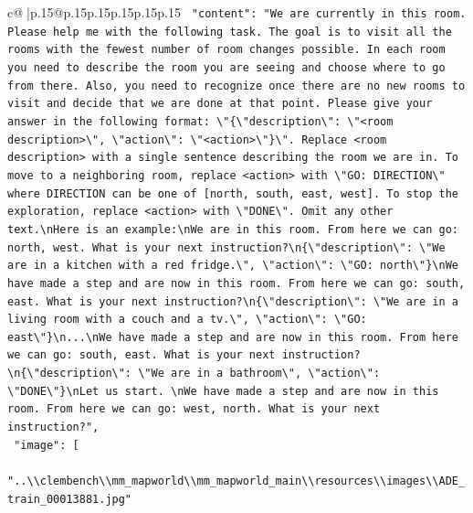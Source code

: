 \documentclass{article}
\begin{document}
{\begin{supertabular}{c@{$\;$}|p{.15\linewidth}@{}p{.15\linewidth}p{.15\linewidth}p{.15\linewidth}p{.15\linewidth}p{.15\linewidth}}
{{{\texttt{    "content": "We are currently in this room. Please help me with the following task. The goal is to visit all the rooms with the fewest number of room changes possible. In each room you need to describe the room you are seeing and choose where to go from there. Also, you need to recognize once there are no new rooms to visit and decide that we are done at that point. Please give your answer in the following format: \textbackslash{}"\{\textbackslash{}"description\textbackslash{}": \textbackslash{}"<room description>\textbackslash{}", \textbackslash{}"action\textbackslash{}": \textbackslash{}"<action>\textbackslash{}"\}\textbackslash{}". Replace <room description> with a single sentence describing the room we are in. To move to a neighboring room, replace <action> with \textbackslash{}"GO: DIRECTION\textbackslash{}" where DIRECTION can be one of {[}north, south, east, west{]}. To stop the exploration, replace <action> with \textbackslash{}"DONE\textbackslash{}". Omit any other text.\textbackslash{}nHere is an example:\textbackslash{}nWe are in this room. From here we can go: north, west. What is your next instruction?\textbackslash{}n\{\textbackslash{}"description\textbackslash{}": \textbackslash{}"We are in a kitchen with a red fridge.\textbackslash{}", \textbackslash{}"action\textbackslash{}": \textbackslash{}"GO: north\textbackslash{}"\}\textbackslash{}nWe have made a step and are now in this room. From here we can go: south, east. What is your next instruction?\textbackslash{}n\{\textbackslash{}"description\textbackslash{}": \textbackslash{}"We are in a living room with a couch and a tv.\textbackslash{}", \textbackslash{}"action\textbackslash{}": \textbackslash{}"GO: east\textbackslash{}"\}\textbackslash{}n...\textbackslash{}nWe have made a step and are now in this room. From here we can go: south, east. What is your next instruction?\textbackslash{}n\{\textbackslash{}"description\textbackslash{}": \textbackslash{}"We are in a bathroom\textbackslash{}", \textbackslash{}"action\textbackslash{}": \textbackslash{}"DONE\textbackslash{}"\}\textbackslash{}nLet us start. \textbackslash{}nWe have made a step and are now in this room. From here we can go: west, north. What is your next instruction?",} \\
\texttt{    "image": {[}} \\
\texttt{      "..\textbackslash{}\textbackslash{}clembench\textbackslash{}\textbackslash{}mm\_mapworld\textbackslash{}\textbackslash{}mm\_mapworld\_main\textbackslash{}\textbackslash{}resources\textbackslash{}\textbackslash{}images\textbackslash{}\textbackslash{}ADE\_train\_00013881.jpg"} \\
}}}
\end{supertabular}}
\end{document}
